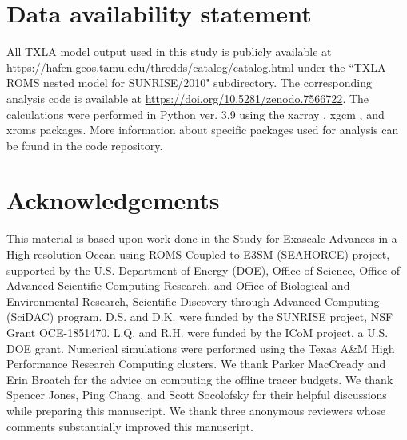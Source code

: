 \section{Data availability statement} 
All TXLA model output used in this study is publicly available at \url{https://hafen.geos.tamu.edu/thredds/catalog/catalog.html} under the ``TXLA ROMS nested model for SUNRISE/2010" subdirectory. The corresponding analysis code is available at \url{https://doi.org/10.5281/zenodo.7566722}. The calculations were performed in Python ver. 3.9 using the xarray \citep{hoyer_stephan_2021_5771208}, xgcm \citep{abernathey_ryan_p_2022_6643579}, and xroms \citep{xroms} packages. More information about specific packages used for analysis can be found in the code repository. 

\section{Acknowledgements}
This material is based upon work done in the Study for Exascale Advances in a High-resolution Ocean using ROMS Coupled to E3SM (SEAHORCE) project, supported by the U.S. Department of Energy (DOE), Office of Science, Office of Advanced Scientific Computing Research, and Office of Biological and Environmental Research, Scientific Discovery through Advanced Computing (SciDAC) program. D.S. and D.K. were funded by the SUNRISE project, NSF Grant OCE-1851470. L.Q. and R.H. were funded by the ICoM project, a U.S. DOE grant. Numerical simulations were performed using the Texas A\&M High Performance Research Computing clusters. We thank Parker MacCready and Erin Broatch for the advice on computing the offline tracer budgets. We thank Spencer Jones, Ping Chang, and Scott Socolofsky for their helpful discussions while preparing this manuscript. We thank three anonymous reviewers whose comments substantially improved this manuscript.
% 
% 
